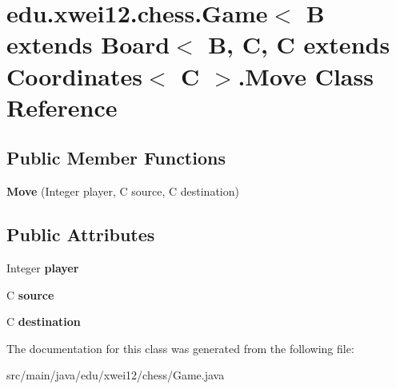 \hypertarget{classedu_1_1xwei12_1_1chess_1_1_game_1_1_move}{}\section{edu.\+xwei12.\+chess.\+Game$<$ B extends Board$<$ B, C, C extends Coordinates$<$ C $>$.Move Class Reference}
\label{classedu_1_1xwei12_1_1chess_1_1_game_1_1_move}
\subsection*{Public Member Functions}
\begin{DoxyCompactItemize}
\item 
{\bfseries Move} (Integer player, C source, C destination)\hypertarget{classedu_1_1xwei12_1_1chess_1_1_game_1_1_move_ac15de338737674efff8defc8bde4687e}{}\label{classedu_1_1xwei12_1_1chess_1_1_game_1_1_move_ac15de338737674efff8defc8bde4687e}

\end{DoxyCompactItemize}
\subsection*{Public Attributes}
\begin{DoxyCompactItemize}
\item 
Integer {\bfseries player}\hypertarget{classedu_1_1xwei12_1_1chess_1_1_game_1_1_move_a8c7f161b862a49d80b0a8aa9d8a5aa30}{}\label{classedu_1_1xwei12_1_1chess_1_1_game_1_1_move_a8c7f161b862a49d80b0a8aa9d8a5aa30}

\item 
C {\bfseries source}\hypertarget{classedu_1_1xwei12_1_1chess_1_1_game_1_1_move_ab3afddeaccef45c7b93e7f7c82bf7952}{}\label{classedu_1_1xwei12_1_1chess_1_1_game_1_1_move_ab3afddeaccef45c7b93e7f7c82bf7952}

\item 
C {\bfseries destination}\hypertarget{classedu_1_1xwei12_1_1chess_1_1_game_1_1_move_a58ec0b87f29d223bb00e5d3a203fffd0}{}\label{classedu_1_1xwei12_1_1chess_1_1_game_1_1_move_a58ec0b87f29d223bb00e5d3a203fffd0}

\end{DoxyCompactItemize}


The documentation for this class was generated from the following file\+:\begin{DoxyCompactItemize}
\item 
src/main/java/edu/xwei12/chess/Game.\+java\end{DoxyCompactItemize}
